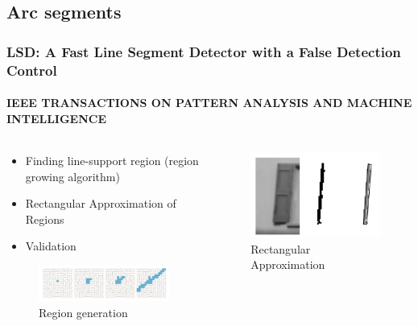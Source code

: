 \documentclass[aspectratio=169]{beamer}
\begin{document}
    \subsection{Arc segments}
    \begin{frame}
        \frametitle{LSD: A Fast Line Segment Detector with a False Detection Control}
        \framesubtitle{IEEE TRANSACTIONS ON PATTERN ANALYSIS AND MACHINE INTELLIGENCE}
        \begin{columns}
            \begin{column}{.5\linewidth}
                \begin{itemize}
                    \item Finding line-support region (region growing algorithm)
                    \item Rectangular Approximation of Regions
                    \item Validation
                \end{itemize}
                \begin{figure}
                    \includegraphics[width=\linewidth]{pic/region.png}
                    \caption{Region generation}
                \end{figure}
            \end{column}
            \begin{column}{.5\linewidth}
                
                \begin{figure}
                    \includegraphics[width=.5\linewidth]{pic/rect.png}
                    \caption{Rectangular Approximation}
                \end{figure}
            \end{column}
        \end{columns}
    \end{frame}
\end{document}
